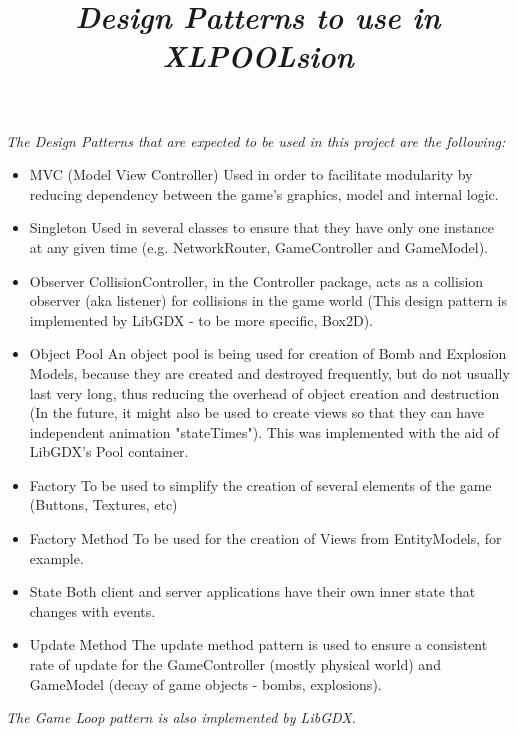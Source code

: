 \documentclass[12pt,a4paper]{article}
\title{\emph{{\Huge Design Patterns to use in XLPOOLsion}}}
\date{}
\author{}
\begin{document}
\maketitle

\emph{\large The Design Patterns that are expected to be used in this project are the following:}

\begin{itemize}
\item MVC (Model View Controller)
	\subitem Used in order to facilitate modularity by reducing dependency between the game's graphics, model and internal logic.
\item Singleton
	\subitem Used in several classes to ensure that they have only one instance at any given time (e.g. NetworkRouter, GameController and GameModel).
\item Observer
	\subitem CollisionController, in the Controller package, acts as a collision observer (aka listener) for collisions in the game world (This design pattern is implemented by LibGDX - to be more specific, Box2D).
\item Object Pool
	\subitem An object pool is being used for creation of Bomb and Explosion Models, because they are created and destroyed frequently, but do not usually last very long, thus reducing the overhead of object creation and destruction (In the future, it might also be used to create views so that they can have independent animation "stateTimes"). This was implemented with the aid of LibGDX's Pool container.
\item Factory
	\subitem To be used to simplify the creation of several elements of the game (Buttons, Textures, etc)
\item Factory Method
	\subitem To be used for the creation of Views from EntityModels, for example.
\item State
	\subitem Both client and server applications have their own inner state that changes with events.
\item Update Method
	\subitem The update method pattern is used to ensure a consistent rate of update for the GameController (mostly physical world) and GameModel (decay of game objects - bombs, explosions).
\end{itemize}

\textit{The Game Loop pattern is also implemented by LibGDX.}
\end{document}
